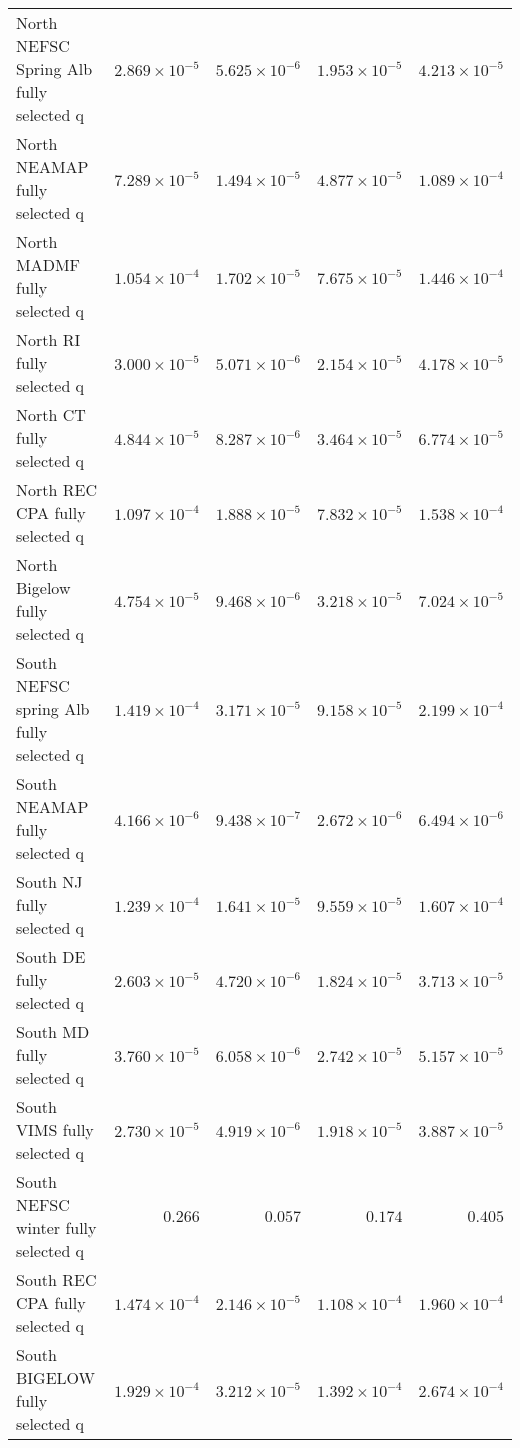 \documentclass[
]{article}
\begin{document}
\begin{landscape}
\begin{longtable}[t]{lrrrr}
\addlinespace
North NEFSC Spring Alb fully selected q & $2.869\times 10^{-5}$ & $5.625\times 10^{-6}$ & $1.953\times 10^{-5}$ & $4.213\times 10^{-5}$\\
North NEAMAP fully selected q & $7.289\times 10^{-5}$ & $1.494\times 10^{-5}$ & $4.877\times 10^{-5}$ & $1.089\times 10^{-4}$\\
North MADMF fully selected q & $1.054\times 10^{-4}$ & $1.702\times 10^{-5}$ & $7.675\times 10^{-5}$ & $1.446\times 10^{-4}$\\
North RI fully selected q & $3.000\times 10^{-5}$ & $5.071\times 10^{-6}$ & $2.154\times 10^{-5}$ & $4.178\times 10^{-5}$\\
North CT fully selected q & $4.844\times 10^{-5}$ & $8.287\times 10^{-6}$ & $3.464\times 10^{-5}$ & $6.774\times 10^{-5}$\\
\addlinespace
North REC CPA fully selected q & $1.097\times 10^{-4}$ & $1.888\times 10^{-5}$ & $7.832\times 10^{-5}$ & $1.538\times 10^{-4}$\\
North Bigelow fully selected q & $4.754\times 10^{-5}$ & $9.468\times 10^{-6}$ & $3.218\times 10^{-5}$ & $7.024\times 10^{-5}$\\
South NEFSC spring Alb fully selected q & $1.419\times 10^{-4}$ & $3.171\times 10^{-5}$ & $9.158\times 10^{-5}$ & $2.199\times 10^{-4}$\\
South NEAMAP fully selected q & $4.166\times 10^{-6}$ & $9.438\times 10^{-7}$ & $2.672\times 10^{-6}$ & $6.494\times 10^{-6}$\\
South NJ fully selected q & $1.239\times 10^{-4}$ & $1.641\times 10^{-5}$ & $9.559\times 10^{-5}$ & $1.607\times 10^{-4}$\\
\addlinespace
South DE fully selected q & $2.603\times 10^{-5}$ & $4.720\times 10^{-6}$ & $1.824\times 10^{-5}$ & $3.713\times 10^{-5}$\\
South MD fully selected q & $3.760\times 10^{-5}$ & $6.058\times 10^{-6}$ & $2.742\times 10^{-5}$ & $5.157\times 10^{-5}$\\
South VIMS fully selected q & $2.730\times 10^{-5}$ & $4.919\times 10^{-6}$ & $1.918\times 10^{-5}$ & $3.887\times 10^{-5}$\\
South NEFSC winter fully selected q & $0.266$ & $0.057$ & $0.174$ & $0.405$\\
South REC CPA fully selected q & $1.474\times 10^{-4}$ & $2.146\times 10^{-5}$ & $1.108\times 10^{-4}$ & $1.960\times 10^{-4}$\\
\addlinespace
South BIGELOW fully selected q & $1.929\times 10^{-4}$ & $3.212\times 10^{-5}$ & $1.392\times 10^{-4}$ & $2.674\times 10^{-4}$\\

\end{longtable}
\end{landscape}
\end{document}
